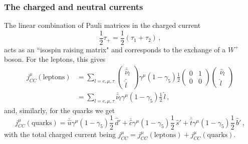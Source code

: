   \subsubsection{The charged and neutral currents}
  The linear combination of Pauli matrices in the charged current
  \begin{equation}
      \frac{1}{2}\tau_+ = \frac{1}{2}(\tau_1 + \tau_2) \,,
  \end{equation}
  acts as an ``isospin raising matrix" and corresponds to the exchange of a
  $W^+$ boson.
  For the leptons, this gives~\cite{Paschos:2007pi}
  \begin{equation}
    \begin{aligned}
      j^{\mu}_{CC}(\textrm{leptons}) &= \sum_{l=e,\mu,\tau}
      \begin{pmatrix}
          \bar{\hat{\nu}}_l \\
          \bar{\hat{l}}
      \end{pmatrix}
      \gamma^{\mu}(1-\gamma_5)\frac{1}{2}
      \begin{pmatrix}
        0 & 1 \\
        0 & 0
      \end{pmatrix}
      \begin{pmatrix}
        \hat{\nu}_l \\
          \hat{l}
      \end{pmatrix} \\
      &= \sum_{l=e,\mu,\tau} \bar{\hat{\nu}}_{l} \gamma^{\mu}(1-\gamma_5)\frac{1}{2}\, \hat{l} \,,
    \end{aligned}
  \end{equation}
  and, similarly, for the quarks we get
  \begin{equation}
      j^{\mu}_{CC}(\textrm{quarks}) =
       \bar{\hat{u}}\gamma^{\mu}(1-\gamma_5)\frac{1}{2}\,\hat{d}'
       +\bar{\hat{c}}\gamma^{\mu}(1-\gamma_5)\frac{1}{2}\,\hat{s}'
       +\bar{\hat{t}}\gamma^{\mu}(1-\gamma_5)\frac{1}{2}\,\hat{b}' \,,
  \end{equation}
  with the total charged current being $j^{\mu}_{CC} =
  j^{\mu}_{CC}(\textrm{leptons}) + j^{\mu}_{CC}(\textrm{quarks})$.


